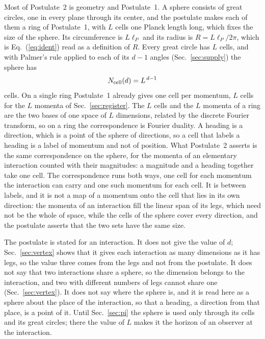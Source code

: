 \documentclass[aps,prd,twocolumn,superscriptaddress,nofootinbib]{revtex4-2}
\begin{document}
Most of Postulate~2 is geometry and Postulate~1. A sphere consists of great circles, one in every plane through its center, and the postulate makes each of them a ring of Postulate~1, with $L$ cells one Planck length long, which fixes the size of the sphere. Its circumference is $L\ell_P$ and its radius is $R = L\ell_P/2\pi$, which is Eq.~(\ref{eq:ident}) read as a definition of $R$. Every great circle has $L$ cells, and with Palmer's rule applied to each of its $d-1$ angles (Sec.~\ref{sec:supply}) the sphere has
\begin{equation}
N_{\rm cell}(d) = L^{\,d-1}
\label{eq:cells}
\end{equation}
cells. On a single ring Postulate~1 already gives one cell per momentum, $L$ cells for the $L$ momenta of Sec.~\ref{sec:register}. The $L$ cells and the $L$ momenta of a ring are the two bases of one space of $L$ dimensions, related by the discrete Fourier transform, so on a ring the correspondence is Fourier duality. A heading is a direction, which is a point of the sphere of directions, so a cell that labels a heading is a label of momentum and not of position. What Postulate~2 asserts is the same correspondence on the sphere, for the momenta of an elementary interaction counted with their magnitudes: a magnitude and a heading together take one cell. The correspondence runs both ways, one cell for each momentum the interaction can carry and one such momentum for each cell. It is between labels, and it is not a map of a momentum onto the cell that lies in its own direction: the momenta of an interaction fill the linear span of its legs, which need not be the whole of space, while the cells of the sphere cover every direction, and the postulate asserts that the two sets have the same size.

The postulate is stated for an interaction. It does not give the value of $d$; Sec.~\ref{sec:vertex} shows that it gives each interaction as many dimensions as it has legs, so the value three comes from the legs and not from the postulate. It does not say that two interactions share a sphere, so the dimension belongs to the interaction, and two with different numbers of legs cannot share one (Sec.~\ref{sec:vertex}). It does not say where the sphere is, and it is read here as a sphere about the place of the interaction, so that a heading, a direction from that place, is a point of it. Until Sec.~\ref{sec:pi} the sphere is used only through its cells and its great circles; there the value of $L$ makes it the horizon of an observer at the interaction.
\end{document}
